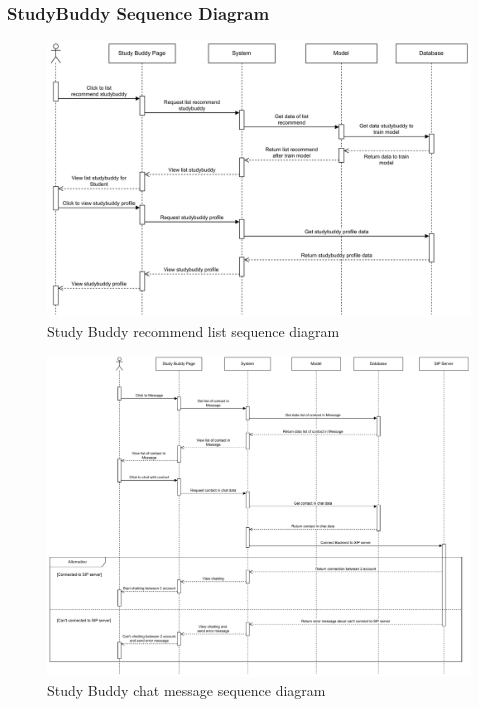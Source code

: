 \subsubsection{StudyBuddy Sequence Diagram}
    \begin{figure}[H]
        \centering
        \includegraphics[width=1\textwidth]{image/StudyBuddySequenceDiagram-SB.pdf} 
        \caption{Study Buddy recommend list sequence diagram}
        \label{fig:studyBuddy_recommendlist_sequence}
    \end{figure}

    \begin{figure}[H]
        \centering
        \includegraphics[width=1\textwidth]{image/StudyBuddySequenceDiagram-Message.pdf} 
        \caption{Study Buddy chat message sequence diagram}
        \label{fig:studyBuddy_chatmessage_sequence}
    \end{figure}

